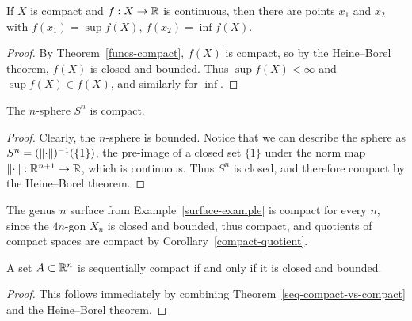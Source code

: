 \begin{cor}
  If $X$ is compact and $f : X \to \mathbb{R}$ is continuous, then there are points $x_1$ and $x_2$ with $f(x_1) = \sup f(X)$, $f(x_2) = \inf f(X)$.
\end{cor}
\begin{proof}
  By Theorem~\ref{funcs-compact}, $f(X)$ is compact, so by the Heine--Borel theorem, $f(X)$ is closed and bounded. Thus $\sup f(X) < \infty$ and $\sup f(X) \in f(X)$, and similarly for $\inf$.
\end{proof}
\begin{cor}
  The $n$-sphere $S^n$ is compact.
\end{cor}
\begin{proof}
  Clearly, the $n$-sphere is bounded. Notice that we can describe the sphere as $S^n = (\lVert \cdot \rVert)^{-1}(\{1\})$, the pre-image of a closed set $\{1\}$ under the norm map $\lVert \cdot \rVert : \mathbb{R}^{n+1} \to \mathbb{R}$, which is continuous. Thus $S^n$ is closed, and therefore compact by the Heine--Borel theorem.
\end{proof}
\begin{example}
  The genus $n$ surface from Example~\ref{surface-example} is compact for every $n$, since the $4n$-gon $X_n$ is closed and bounded, thus compact, and quotients of compact spaces are compact by Corollary~\ref{compact-quotient}.
\end{example}
\begin{thm}
  A set $A \subset \mathbb{R}^n$ is sequentially compact if and only if it is closed and bounded.
\end{thm}
\begin{proof}
  This follows immediately by combining Theorem~\ref{seq-compact-vs-compact} and the Heine--Borel theorem.
\end{proof}
